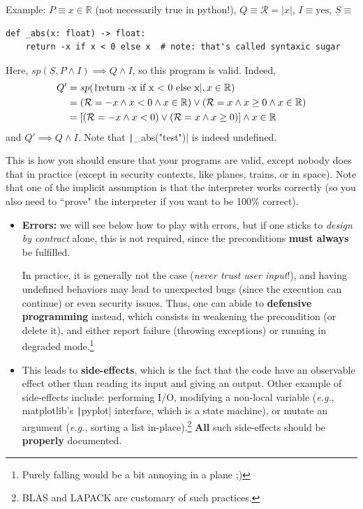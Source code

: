 \documentclass[10pt,
aspectratio=169
]{beamer}
\begin{document}
\begin{frame}[fragile]
	Example: $P \equiv x\in\mathbb{R}$ (not necessarily true in python!), $Q\equiv \mathcal{R} = |x|$, $I \equiv \text{yes}$, $\underline{S} \equiv$\begin{verbatim}
def _abs(x: float) -> float:
	return -x if x < 0 else x  # note: that's called syntaxic sugar
	\end{verbatim}
	Here, $sp(\underline{S}, P \land I) \implies Q \land I$, so this program is valid. Indeed, \begin{align*}
		Q' &= sp(\text{\texttt|return -x if x < 0 else x|}, x\in\mathbb{R}) \\
		&= (\mathcal{R} = -x \land x < 0 \land x\in\mathbb{R}) \lor (\mathcal{R} = x \land x \geq 0 \land x\in\mathbb{R})\\
		&= [(\mathcal{R} = -x \land x < 0) \lor (\mathcal{R} = x \land x \geq 0)]  \land x\in\mathbb{R}
	\end{align*}
	and $Q' \implies Q \land I$. Note that \texttt|_abs("test")| is indeed undefined.
	
	This is how you should ensure that your programs are valid, except nobody does that in practice (except in security contexts, like planes, trains, or in space). Note that one of the implicit assumption is that the interpreter works correctly (so you also need to ``prove" the interpreter if you want to be 100\% correct).
\end{frame}

\begin{frame}
	\begin{itemize}
		\item \textbf{Errors:} we will see below how to play with errors, but if one sticks to \textit{design by contract} alone, this is not required, since the preconditions \textbf{must always} be fulfilled. 
		
		In practice, it is generally not the case (\textit{never trust user input}!), and having undefined behaviors may lead to unexpected bugs (since the execution can continue) or even security issues. Thus, one can abide to \textbf{defensive programming} instead, which consists in weakening the precondition (or delete it), and either report failure (throwing exceptions) or running in degraded mode.\footnote{Purely falling would be a bit annoying in a plane ;)}
		 \item This leads to \textbf{side-effects}, which is the fact that the code have an observable effect other than reading its input and giving an output. Other example of side-effects include: performing I/O, modifying a non-local variable (\textit{e.g.}, matplotlib's \texttt|pyplot| interface, which is a state machine), or mutate an argument (\textit{e.g.}, sorting a list in-place).\footnote{BLAS and LAPACK are customary of such practices.} \textbf{All} such side-effects should be \textbf{properly} documented.
	\end{itemize}
\end{frame}
\end{document}
